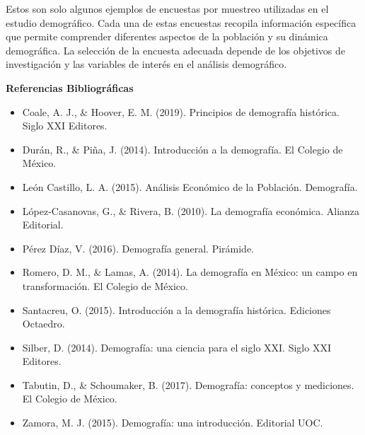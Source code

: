 \documentclass[8pt,a4paper]{beamer}
\begin{document}
{\begin{frame}{}
\begin{block}{}
\justifying
Estos son solo algunos ejemplos de encuestas por muestreo utilizadas en el estudio demográfico. Cada una de estas encuestas recopila información específica que permite comprender diferentes aspectos de la población y su dinámica demográfica. La selección de la encuesta adecuada depende de los objetivos de investigación y las variables de interés en el análisis demográfico.
\end{block}
\end{frame}


\begin{frame}{\textbf{Referencias Bibliográficas}}

\begin{itemize}
\justifying
\item Coale, A. J., \& Hoover, E. M. (2019). Principios de demografía histórica. Siglo XXI Editores.
\item Durán, R., \& Piña, J. (2014). Introducción a la demografía. El Colegio de México.
\item León Castillo, L. A. (2015). Análisis Económico de la Población. Demografía.
\item López-Casanovas, G., \& Rivera, B. (2010). La demografía económica. Alianza Editorial.
\item Pérez Díaz, V. (2016). Demografía general. Pirámide.
\item Romero, D. M., \& Lamas, A. (2014). La demografía en México: un campo en transformación. El Colegio de México.
\item Santacreu, O. (2015). Introducción a la demografía histórica. Ediciones Octaedro.
\item Silber, D. (2014). Demografía: una ciencia para el siglo XXI. Siglo XXI Editores.
\item Tabutin, D., \& Schoumaker, B. (2017). Demografía: conceptos y mediciones. El Colegio de México.
\item Zamora, M. J. (2015). Demografía: una introducción. Editorial UOC.
\end{itemize}

\end{frame}

}
\end{document}
